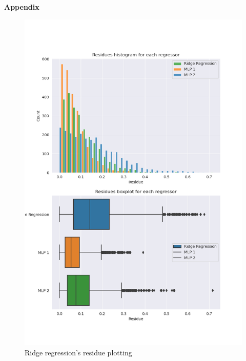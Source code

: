 \documentclass[12pt]{article}
\begin{document}
\pagebreak

\large{\textbf{Appendix}\vskip 0.3cm}




\begin{figure}[H]
  \centering
  \includegraphics[width=\textwidth]{../assets/residues.png}
  \caption{Ridge regression's residue plotting}
  \label{fig:residue-plotting}
\end{figure}
\end{document}
